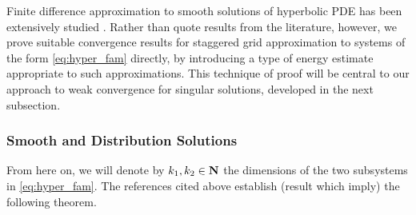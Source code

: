 Finite difference approximation to smooth solutions of hyperbolic PDE has been
extensively studied \cite[]{RichMor:67,Cohen:01,Leveque:07}. Rather
than quote results from the literature, however, we prove suitable
convergence results for staggered grid approximation to systems of the
form \ref{eq:hyper_fam} directly, by introducing a type of energy estimate
appropriate to such approximations. This technique of proof will be
central to our approach to weak convergence for singular solutions,
developed in the next subsection.


\subsubsection{Smooth and Distribution Solutions}

From here on, we will denote by $k_1, k_2 \in {\bf N}$ the dimensions of
the two subsystems in \ref{eq:hyper_fam}.  The references cited above
establish (result which imply) the following theorem.%


